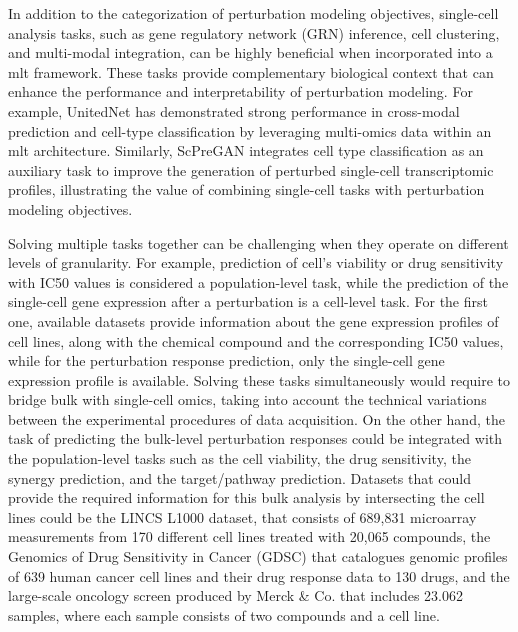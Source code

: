 \documentclass[12pt, a4paper]{article}
\begin{document}
In addition to the categorization of perturbation modeling objectives, single-cell analysis tasks, such as gene regulatory network (GRN) inference, cell clustering, and multi-modal integration, can be highly beneficial when incorporated into a \gls{mlt} framework. These tasks provide complementary biological context that can enhance the performance and interpretability of perturbation modeling.
For example, UnitedNet \cite{tangExplainableMultitaskLearning2023} has demonstrated strong performance in cross-modal prediction and cell-type classification by leveraging multi-omics data within an \gls{mlt} architecture. Similarly, ScPreGAN \cite{weiScPreGANDeepGenerative2022} integrates cell type classification as an auxiliary task to improve the generation of perturbed single-cell transcriptomic profiles, illustrating the value of combining single-cell tasks with perturbation modeling objectives.

Solving multiple tasks together can be challenging when they operate on different levels of granularity. For example, prediction of cell's viability or drug sensitivity with IC50 values is considered a population-level task, while the prediction of the single-cell gene expression after a perturbation is a cell-level task. For the first one, available datasets provide information about the gene expression profiles of cell lines, along with the chemical compound and the corresponding IC50 values, while for the perturbation response prediction, only the single-cell gene expression profile is available. Solving these tasks simultaneously would require to bridge bulk with single-cell omics, taking into account the technical variations between the experimental procedures of data acquisition. On the other hand, the task of predicting the bulk-level perturbation responses could be integrated with the population-level tasks such as the cell viability, the drug sensitivity, the synergy prediction, and the target/pathway prediction. Datasets that could provide the required information for this bulk analysis by intersecting the cell lines could be the LINCS L1000 dataset, that consists of 689,831 microarray measurements from 170 different cell lines treated with 20,065 compounds, the Genomics of Drug Sensitivity in Cancer (GDSC) that catalogues genomic profiles of 639 human cancer cell lines and their drug response data to 130 drugs, and the large-scale oncology screen produced by Merck \& Co. \cite{o2016unbiased} that includes 23.062 samples, where each sample consists of two compounds and a cell line.
\end{document}
